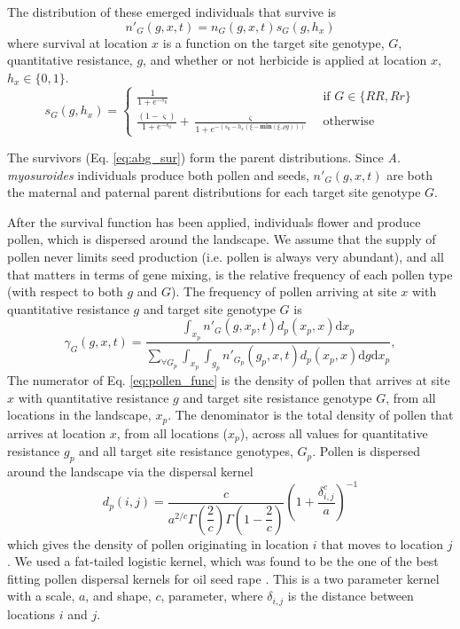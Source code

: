 \documentclass[10pt,letterpaper]{article}
\begin{document}
The distribution of these emerged individuals that survive is 
\begin{equation}\label{eq:abg_sur}
	n'_G(g, x, t) = n_G(g, x, t)s_G(g, h_x) 
\end{equation}
where survival at location $x$ is a function on the target site genotype, $G$, quantitative resistance, $g$, and whether or not herbicide is applied at location $x$, $h_x \in \{0, 1\}$.   
\begin{equation}\label{eq:sur_G}
	s_G(g, h_x) = \begin{cases} 
		\frac{1}{1 + e^{-s_0}} &\text{~if~} G \in \{RR, Rr\} \\
		\frac{(1 - \varsigma)}{1 + e^{-s_0}} + \frac{\varsigma}{1 + e^{-\left(s_0 - h_x\left(\xi - \textbf{min}(\xi, \rho g) \right)\right)}} &\text{~otherwise~} 		
	\end{cases} 
\end{equation}  

The survivors (Eq. \ref{eq:abg_sur}) form the parent distributions. Since \textit{A. myosuroides} individuals produce both pollen and seeds, $n'_G(g, x, t)$ are both the maternal and paternal parent distributions for each target site genotype $G$. 

After the survival function has been applied, individuals flower and produce pollen, which is dispersed around the landscape. We assume that the supply of pollen never limits seed production (i.e. pollen is always very abundant), and all that matters in terms of gene mixing, is the relative frequency of each pollen type (with respect to both $g$ and $G$). The frequency of pollen arriving at site $x$ with quantitative resistance $g$ and target site genotype $G$ is 
\begin{equation}\label{eq:pollen_func}
\gamma_G(g, x, t) = \frac{\int_{x_p} n'_G(g, x_p, t)d_p(x_p, x)\text{d}x_p} {\sum_{\forall G_p}\int_{x_p}\int_{g_p} n'_{G_p}(g_p, x, t) d_p(x_p, x)\text{d}g \text{d}x_p}, 
\end{equation}
The numerator of Eq. \ref{eq:pollen_func} is the density of pollen that arrives at site $x$ with quantitative resistance $g$ and target site resistance genotype $G$, from all locations in the landscape, $x_p$. The denominator is the total density of pollen that arrives at location $x$, from all locations ($x_p$), across all values for quantitative resistance $g_p$ and all target site resistance genotypes, $G_p$. Pollen is dispersed around the landscape via the dispersal kernel  
\begin{equation}\label{eq:pollen_disp}
	d_p(i, j) = \frac{c}{a^{2/c}\Gamma\left(\dfrac{2}{c} \right)\Gamma\left(1 - \dfrac{2}{c} \right)}{\left( 1 + \dfrac{\delta_{i,j}^c}{a} \right)}^{-1} 
\end{equation} 
which gives the density of pollen originating in location $i$ that moves to location $j$. We used a fat-tailed logistic kernel, which was found to be the one of the best fitting pollen dispersal kernels for oil seed rape \cite{Klei2006}. This is a two parameter kernel with a scale, $a$, and shape, $c$, parameter, where $\delta_{i,j}$ is the distance between locations $i$ and $j$. 
\end{document}
